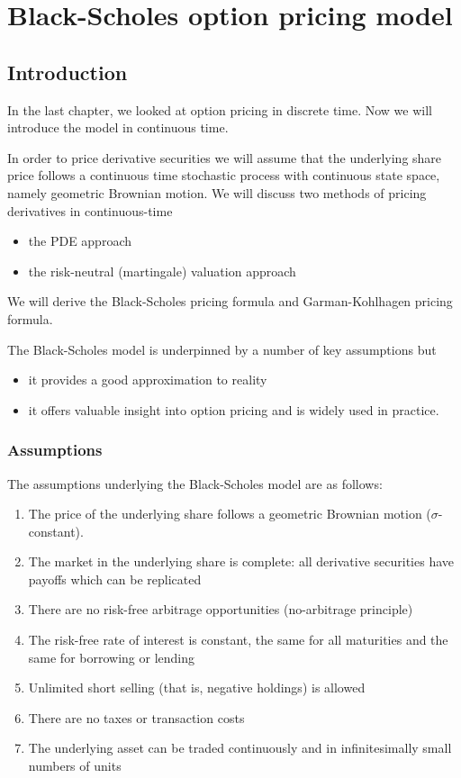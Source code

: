 \documentclass[11pt,a4paper]{book}
\theoremstyle{definition}\newtheorem{definition}{Definition}
\theoremstyle{definition}\newtheorem{fact}{Fact}
\theoremstyle{definition}\newtheorem{remark}{Remark}
\theoremstyle{definition}\newtheorem{ex}{Ex.}
\theoremstyle{definition}\newtheorem{project}{Project}
\theoremstyle{definition}\newtheorem{problem}{Problem}
\theoremstyle{definition}\newtheorem{example}{Example}
\numberwithin{theorem}{section}
\numberwithin{corollary}{chapter}
\numberwithin{assumption}{chapter}
\numberwithin{definition}{chapter}
\numberwithin{prop}{chapter}
\numberwithin{notation}{chapter}
\numberwithin{problem}{chapter}
\numberwithin{example}{chapter}
\numberwithin{fact}{chapter}
\numberwithin{ex}{chapter}
\begin{document}
\chapter{Black-Scholes option pricing model}

\section{Introduction}
In the last chapter, we looked at option pricing in discrete time. Now we will introduce the model in continuous time.

In order to price derivative securities we will assume that the underlying share price follows a continuous time stochastic process with continuous state space, namely geometric Brownian motion. We will discuss two methods of pricing derivatives in continuous-time
\begin{itemize}
\item the PDE approach
\item the risk-neutral (martingale) valuation approach
\end{itemize}
We will derive the Black-Scholes pricing formula and Garman-Kohlhagen pricing formula.

The Black-Scholes model is underpinned by a number of key assumptions but
\begin{itemize}
\item it provides a good approximation to reality
\item it offers valuable insight into option pricing and is widely used in practice.
\end{itemize}

\subsection{Assumptions}
The assumptions underlying the Black-Scholes model are as follows:
\begin{enumerate}
\item The price of the underlying share follows a geometric Brownian motion ($\sigma$-constant).
\item The market in the underlying share is complete: all derivative securities have payoffs which can be replicated
\item There are no risk-free arbitrage opportunities (no-arbitrage principle)
\item The risk-free rate of interest is constant, the same for all maturities and the same for borrowing or lending
\item Unlimited short selling (that is, negative holdings) is allowed
\item There are no taxes or transaction costs
\item The underlying asset can be traded continuously and in infinitesimally small numbers of units
\end{enumerate}
\end{document}
